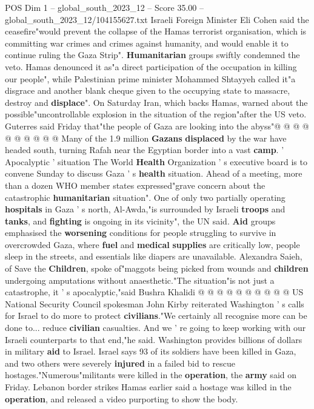 \begin{textsample}{POS Dim 1 – global\_south\_2023\_12 – Score 35.00 – global\_south\_2023\_12/104155627.txt}
Israeli Foreign Minister Eli Cohen said the ceasefire"would prevent the collapse of the Hamas terrorist organisation, which is committing war crimes and crimes against humanity, and would enable it to continue ruling the Gaza Strip". \textbf{Humanitarian} groups swiftly condemned the veto.
Hamas denounced it as"a direct participation of the occupation in killing our people", while Palestinian prime minister Mohammed Shtayyeh called it"a disgrace and another blank cheque given to the occupying state to massacre, destroy and \textbf{displace}".
On Saturday Iran, which backs Hamas, warned about the possible"uncontrollable explosion in the situation of the region"after the US veto.
Guterres said Friday that"the people of Gaza are looking into the abyss"@ @ @ @ @ @ @ @ @ @ Many of the 1.9 million \textbf{Gazans} \textbf{displaced} by the war have headed south, turning Rafah near the Egyptian border into a vast \textbf{camp}. ' Apocalyptic ' situation The World \textbf{Health} Organization ' s executive board is to convene Sunday to discuss Gaza ' s \textbf{health} situation.
Ahead of a meeting, more than a dozen WHO member states expressed"grave concern about the catastrophic \textbf{humanitarian} situation".
One of only two partially operating \textbf{hospitals} in Gaza ' s north, Al-Awda,"is surrounded by Israeli \textbf{troops} and \textbf{tanks}, and \textbf{fighting} is ongoing in its vicinity", the UN said. \textbf{Aid} groups emphasised the \textbf{worsening} conditions for people struggling to survive in overcrowded Gaza, where \textbf{fuel} and \textbf{medical} \textbf{supplies} are critically low, people sleep in the streets, and essentials like diapers are unavailable.
Alexandra Saieh, of Save the \textbf{Children}, spoke of"maggots being picked from wounds and \textbf{children} undergoing amputations without anaesthetic."The situation"is not just a catastrophe, it ' s apocalyptic,"said Bushra Khalidi @ @ @ @ @ @ @ @ @ @ US National Security Council spokesman John Kirby reiterated Washington ' s calls for Israel to do more to protect \textbf{civilians}."We certainly all recognise more can be done to... reduce \textbf{civilian} casualties.
And we ' re going to keep working with our Israeli counterparts to that end,"he said.
Washington provides billions of dollars in military \textbf{aid} to Israel.
Israel says 93 of its soldiers have been killed in Gaza, and two others were severely \textbf{injured} in a failed bid to rescue hostages."Numerous"militants were killed in the \textbf{operation}, the \textbf{army} said on Friday.
Lebanon border strikes Hamas earlier said a hostage was killed in the \textbf{operation}, and released a video purporting to show the body.

\end{textsample}
